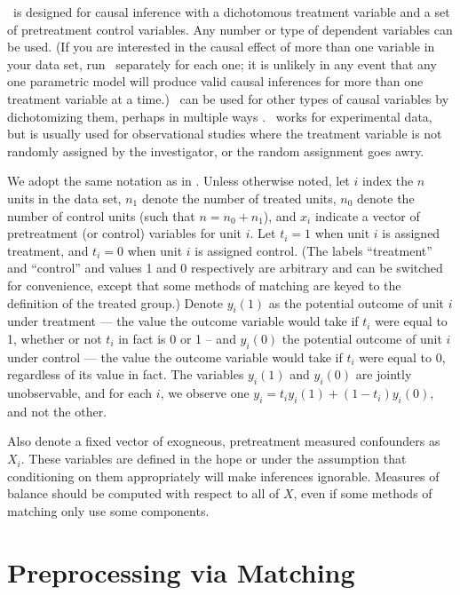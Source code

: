 
\MatchIt\ is designed for causal inference with a dichotomous treatment
variable and a set of pretreatment control variables.  Any number or
type of dependent variables can be used.  (If you are interested in
the causal effect of more than one variable in your data set, run
\MatchIt\ separately for each one; it is unlikely in any event that
any one parametric model will produce valid causal inferences for more
than one treatment variable at a time.)  \MatchIt\ can be used for
other types of causal variables by dichotomizing them, perhaps in
multiple ways \citep[see also][]{ImaDyk04}.  \MatchIt\ works for
experimental data, but is usually used for observational studies where
the treatment variable is not randomly assigned by the investigator,
or the random assignment goes awry.

We adopt the same notation as in \citet*{HoImaKin07}.  Unless
otherwise noted, let $i$ index the $n$ units in the data set, $n_1$
denote the number of treated units, $n_0$ denote the number of control
units (such that $n=n_0+n_1$), and $x_i$ indicate a vector of
pretreatment (or control) variables for unit $i$.  Let $t_i=1$ when
unit $i$ is assigned treatment, and $t_i=0$ when unit $i$ is assigned
control.  (The labels ``treatment'' and ``control'' and values 1 and 0
respectively are arbitrary and can be switched for convenience, except
that some methods of matching are keyed to the definition of the
treated group.)  Denote $y_i(1)$ as the potential outcome of unit $i$
under treatment --- the value the outcome variable would take if $t_i$
were equal to 1, whether or not $t_i$ in fact is 0 or 1 -- and
$y_i(0)$ the potential outcome of unit $i$ under control --- the value
the outcome variable would take if $t_i$ were equal to 0, regardless
of its value in fact.  The variables $y_i(1)$ and $y_i(0)$ are jointly
unobservable, and for each $i$, we observe one
$y_i=t_iy_i(1)+(1-t_i)y_i(0)$, and not the other.  

Also denote a fixed vector of exogneous, pretreatment measured
confounders as $X_i$.  These variables are defined in the hope or
under the assumption that conditioning on them appropriately will make
inferences ignorable.  Measures of balance should be computed with
respect to all of $X$, even if some methods of matching only use some
components.

\section{Preprocessing via Matching}

